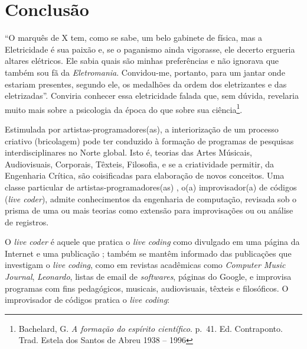 \chapter*[Conclusão]{Conclusão}\label{conclusao}

\begin{citacao}
``O marquês de X tem, como se sabe, um belo gabinete de física, mas a Eletricidade é sua paixão e, se o paganismo ainda vigorasse, ele decerto ergueria altares elétricos. Ele sabia quais são minhas preferências e não ignorava que também sou fã da \emph{Eletromania}. Convidou-me, portanto, para um jantar onde estariam presentes, segundo ele, os medalhões da ordem dos eletrizantes e das eletrizadas''. Conviria conhecer essa eletricidade falada que, sem dúvida, revelaria muito mais sobre a psicologia da época do que sobre sua ciência\footnote{Bachelard, G. \textit{A formação do espírito científico}. p.~41. Ed. Contraponto. Trad. Estela dos Santos de Abreu 1938 -- 1996}.
\end{citacao}

Estimulada por artistas-programadores(as), a interiorização de um processo criativo (bricolagem) pode ter conduzido à formação de programas de pesquisas interdisciplinares no Norte global. Isto é, teorias das Artes Músicais, Audiovisuais, Corporais, Têxteis, Filosofia, e se a criatividade permitir, da Engenharia Crítica, são coisificadas para elaboração de novos conceitos. Uma classe particular de artistas-programadores(as) \cite[p.~16]{McLean2011}, o(a) improvisador(a) de códigos (\emph{live coder}), admite conhecimentos da engenharia de computação, revisada sob o prisma de uma ou mais teorias   como extensão para improvisações ou ou análise de registros.

O \emph{live coder} é aquele que pratica o \emph{live coding} como divulgado em uma página da Internet e uma publicação \cite{ward_live_2004}; também se mantêm informado das publicações que investigam o \emph{live coding}, como em revistas acadêmicas como \emph{Computer Music Journal}, \emph{Leonardo}, listas de email de \emph{softwares}, páginas do Google, e improvisa programas com fins pedagógicos, musicais, audiovisuais, têxteis e filosóficos. O improvisador de códigos pratica o \emph{live coding}:


